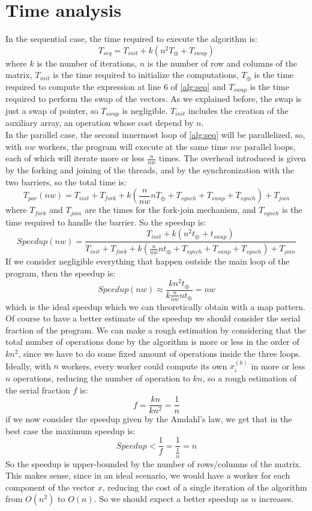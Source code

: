 \documentclass[12pt]{article}
\begin{document}
	\section{Time analysis}
	In the sequential case, the time required to execute the algorithm is:
	\[ T_{seq} = T_{init} + k(n^2T_\oplus + T_{swap}) \]
	where $k$ is the number of iterations, $n$ is the number of row and columns of the matrix, $T_{init}$ is the time required to initialize the computations, $T_\oplus$ is the time required to compute the expression at line 6 of \ref{alg:seq} and $T_{swap}$ is the time required to perform the swap of the vectors. As we explained before, the swap is just a swap of pointer, so $T_{swap}$ is negligible. $T_{init}$ includes the creation of the auxiliary array, an operation whose cost depend by $n$. \\
	In the parallel case, the second innermost loop of \ref{alg:seq} will be parallelized, so, with $nw$ workers, the program will execute at the same time $nw$ parallel loops, each of which will iterate more or less $\frac{n}{nw}$ times. The overhead introduced is given by the forking and joining of the threads, and by the synchronization with the two barriers, so the total time is:
	\[T_{par}(nw) = T_{init} + T_{fork} + k(\frac{n}{nw}nT_\oplus + T_{synch} + T_{swap} + T_{synch}) + T_{join} \]
	where $T_{fork}$ and $T_{join}$ are the times for the fork-join mechanism, and $T_{synch}$ is the time required to handle the barrier.  
	So the speedup is:
	\[ Speedup(nw) = \frac{T_{init} + k(n^2t_\oplus + t_{swap})}{T_{init} + T_{fork} + k(\frac{n}{nw}nt_\oplus + T_{synch} + T_{swap} + T_{synch}) + T_{join}}\]
	If we consider negligible everything that happen outside the main loop of the program, then the speedup is:
	\[ Speedup(nw) \approx \frac{kn^2t_\oplus}{k\frac{n}{nw}nt_\oplus} = nw\]
	which is the ideal speedup which we can theoretically obtain with a map pattern. Of course to have a better estimate of the speedup we should consider the serial fraction of the program. We can make a rough estimation by considering that the total number of operations done by the algorithm is more or less in the order of $kn^2$, since we have to do some fixed amount of operations inside the three loops. Ideally, with $n$ workers, every worker could compute its own $x_i^{(k)}$ in more or less $n$ operations, reducing the number of operation to $kn$, so a rough estimation of the serial fraction $f$ is: 
	\[ f = \frac{kn}{kn^2} = \frac{1}{n}\]
	if we now consider the speedup given by the Amdahl's law, we get that in the best case the maximum speedup is:
	\[ Speedup < \frac{1}{f} = \frac{1}{\frac{1}{n}} = n\]
	So the speedup is upper-bounded by the number of rows/columns of the matrix. This makes sense, since in an ideal scenario, we would have a worker for each component of the vector $x$, reducing the cost of a single iteration of the algorithm from $O(n^2)$ to $O(n)$. So we should expect a better speedup as $n$ increases. 
\end{document}
